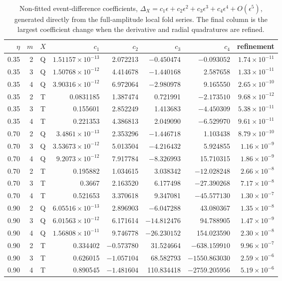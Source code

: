\begin{table}[htbp]
\centering\scriptsize
\caption{Non-fitted event-difference coefficients, $\Delta_X=c_1\epsilon+c_2\epsilon^2+c_3\epsilon^3+c_4\epsilon^4+O(\epsilon^5)$, generated directly from the full-amplitude local fold series. The final column is the largest coefficient change when the derivative and radial quadratures are refined.}
\label{tab:qt-formal}
\begin{tabular}{rrcrrrrr}
\toprule
$\eta$ & $m$ & $X$ & $c_1$ & $c_2$ & $c_3$ & $c_4$ & \textbf{refinement} \\
\midrule
0.35 & 2 & Q & $1.51157\times 10^{-13}$ & 2.072213 & $-0.450474$ & $-0.093052$ & $1.74\times 10^{-11}$ \\
0.35 & 3 & Q & $1.50768\times 10^{-12}$ & 4.414678 & $-1.440168$ & 2.587658 & $1.33\times 10^{-11}$ \\
0.35 & 4 & Q & $3.90316\times 10^{-12}$ & 6.972064 & $-2.980978$ & 9.165550 & $2.65\times 10^{-10}$ \\
0.35 & 2 & T & 0.0831185 & 1.387474 & 0.721991 & $-2.173510$ & $9.68\times 10^{-12}$ \\
0.35 & 3 & T & 0.155601 & 2.852249 & 1.413683 & $-4.450309$ & $5.38\times 10^{-11}$ \\
0.35 & 4 & T & 0.221353 & 4.386813 & 2.049090 & $-6.529970$ & $9.61\times 10^{-11}$ \\
0.70 & 2 & Q & $3.4861\times 10^{-13}$ & 2.353296 & $-1.446718$ & 1.103438 & $8.79\times 10^{-10}$ \\
0.70 & 3 & Q & $3.53673\times 10^{-12}$ & 5.013504 & $-4.216432$ & 5.924855 & $1.16\times 10^{-9}$ \\
0.70 & 4 & Q & $9.2073\times 10^{-12}$ & 7.917784 & $-8.326993$ & 15.710315 & $1.86\times 10^{-9}$ \\
0.70 & 2 & T & 0.195882 & 1.034615 & 3.038342 & $-12.028248$ & $2.66\times 10^{-8}$ \\
0.70 & 3 & T & 0.3667 & 2.163520 & 6.177498 & $-27.390268$ & $7.17\times 10^{-8}$ \\
0.70 & 4 & T & 0.521653 & 3.370618 & 9.347081 & $-45.577130$ & $1.30\times 10^{-7}$ \\
0.90 & 2 & Q & $6.05516\times 10^{-13}$ & 2.896903 & $-6.047288$ & 43.080367 & $1.35\times 10^{-8}$ \\
0.90 & 3 & Q & $6.01563\times 10^{-12}$ & 6.171614 & $-14.812476$ & 94.788905 & $1.47\times 10^{-9}$ \\
0.90 & 4 & Q & $1.56808\times 10^{-11}$ & 9.746778 & $-26.230152$ & 154.023590 & $2.30\times 10^{-8}$ \\
0.90 & 2 & T & 0.334402 & $-0.573780$ & 31.524664 & $-638.159910$ & $9.96\times 10^{-7}$ \\
0.90 & 3 & T & 0.626015 & $-1.057104$ & 68.582793 & $-1550.863030$ & $2.59\times 10^{-6}$ \\
0.90 & 4 & T & 0.890545 & $-1.481604$ & 110.834418 & $-2759.205956$ & $5.19\times 10^{-6}$ \\
\bottomrule
\end{tabular}
\end{table}
